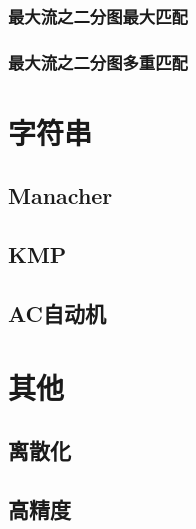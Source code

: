 \documentclass[12pt,a4paper]{article}
\begin{document}
\subsubsection{最大流之二分图最大匹配}

\subsubsection{最大流之二分图多重匹配}

\section{字符串}
\subsection{Manacher}

\subsection{KMP}

\subsection{AC自动机}

\section{其他}
\subsection{离散化}

\subsection{高精度}

\end{document}
